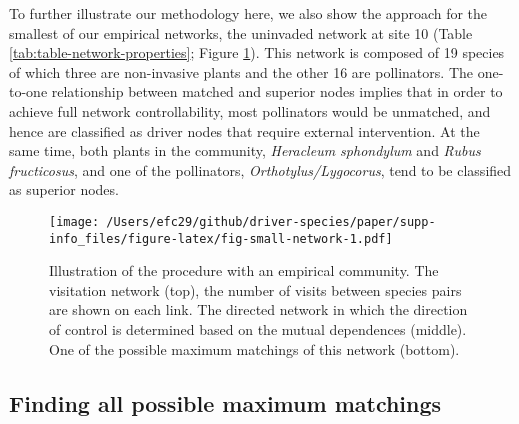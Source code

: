\documentclass[a4paper]{artikel1}
\theoremstyle{definition}
\theoremstyle{definition}
\theoremstyle{definition}
\theoremstyle{remark}
\begin{document}
To further illustrate our methodology here, we also show the approach
for the smallest of our empirical networks, the uninvaded network at
site 10 (Table \ref{tab:table-network-properties}; Figure
\ref{fig:fig-small-network}). This network is composed of 19 species of
which three are non-invasive plants and the other 16 are pollinators.
The one-to-one relationship between matched and superior nodes implies
that in order to achieve full network controllability, most pollinators
would be unmatched, and hence are classified as driver nodes that
require external intervention. At the same time, both plants in the
community, \emph{Heracleum sphondylum} and \emph{Rubus fructicosus}, and
one of the pollinators, \emph{Orthotylus/Lygocorus}, tend to be
classified as superior nodes.

\begin{figure}
\centering
\texttt{[image: /Users/efc29/github/driver-species/paper/supp-info\_files/figure-latex/fig-small-network-1.pdf]}
\caption{\label{fig:fig-small-network}Illustration of the procedure with an
empirical community. The visitation network (top), the number of visits
between species pairs are shown on each link. The directed network in
which the direction of control is determined based on the mutual
dependences (middle). One of the possible maximum matchings of this
network (bottom).}
\end{figure}

\subsection{Finding all possible maximum
matchings}\label{all-maximum-matching}
\end{document}
